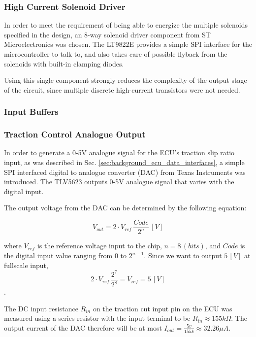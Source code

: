 \subsubsection{High Current Solenoid Driver}

In order to meet the requirement of being able to energize the multiple solenoids specified in the design, an 8-way solenoid driver component from ST Microelectronics was chosen. The LT9822E provides a simple SPI interface for the microcontroller to talk to, and also takes care of possible flyback from the solenoids with built-in clamping diodes.

Using this single component strongly reduces the complexity of the output stage of the circuit, since multiple discrete high-current transistors were not needed.

\subsubsection{Input Buffers}


\subsubsection{Traction Control Analogue Output}

In order to generate a 0-5V analogue signal for the ECU's traction slip ratio input, as was described in Sec. \ref{sec:background_ecu_data_interfaces}, a simple SPI interfaced digital to analogue converter (DAC) from Texas Instruments was introduced. The TLV5623 outputs 0-5V analogue signal that varies with the digital input.

The output voltage from the DAC can be determined by the following equation:

\begin{equation}
V_{out}=2\cdot{V_{ref}}\,\frac{Code}{2^{n}}\,[V]
\end{equation}

where $V_{ref}$ is the reference voltage input to the chip, $n=8\,(bits)$, and $Code$ is the digital input value ranging from $0$ to $2^{n-1}$. Since we want to output $5\,[V]$ at fullscale input, \begin{equation} 2\cdot{V_{ref}}\,\frac{2^{7}}{2^{8}}=V_{ref}=5\,[V]\end{equation}.

The DC input resistance $R_{in}$ on the traction cut input pin on the ECU was measured using a series resistor with the input terminal to be $R_{in}\approx155k\Omega$. The output current of the DAC therefore will be at most $I_{out}=\frac{5v}{155k}\approx32.26\mu A$.
